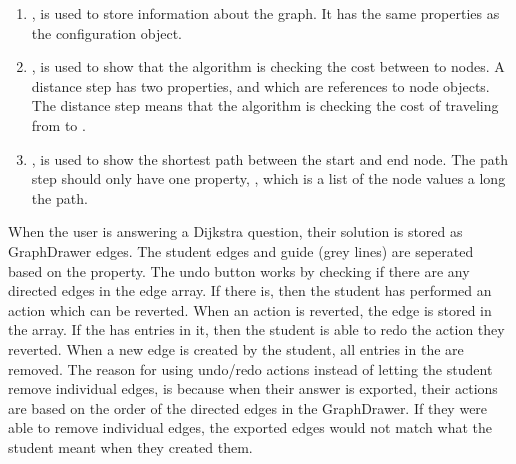 \begin{enumerate}
    \item {}, is used to store information about the graph. It has the same properties as the  configuration object.
    \item {}, is used to show that the algorithm is checking the cost between to nodes. A distance step has two properties,  and  which are references to node objects. The distance step means that the algorithm is checking the cost of traveling from  to .
    \item {}, is used to show the shortest path between the start and end node. The path step should only have one property, , which is a list of the node values a long the path.
\end{enumerate}
When the user is answering a Dijkstra question, their solution is stored as GraphDrawer edges. The student edges and guide (grey lines) are seperated based on the  property. The undo button works by checking if there are any directed edges in the edge array. If there is, then the student has performed an action which can be reverted. When an action is reverted, the edge is stored in the  array. If the  has entries in it, then the student is able to redo the action they reverted. When a new edge is created by the student, all entries in the  are removed. The reason for using undo/redo actions instead of letting the student remove individual edges, is because when their answer is exported, their actions are based on the order of the directed edges in the GraphDrawer. If they were able to remove individual edges, the exported edges would not match what the student meant when they created them.